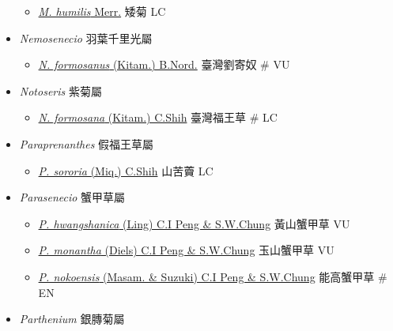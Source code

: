 \begin{itemize}
  \begin{itemize}
        \item[] \href{http://www.theplantlist.org/tpl1.1/search?q=Myriactis+humilis}{\textit{M. humilis} Merr.}   矮菊   LC
  \end{itemize}
 \item[] \textit{Nemosenecio} 羽葉千里光屬
                                
  \begin{itemize}
        \item[] \href{http://www.theplantlist.org/tpl1.1/search?q=Nemosenecio+formosanus}{\textit{N. formosanus} (Kitam.) B.Nord.}   臺灣劉寄奴  \# VU
  \end{itemize}
 \item[] \textit{Notoseris} 紫菊屬
                                
  \begin{itemize}
        \item[] \href{http://www.theplantlist.org/tpl1.1/search?q=Notoseris+formosana}{\textit{N. formosana} (Kitam.) C.Shih}   臺灣福王草  \# LC
  \end{itemize}
 \item[] \textit{Paraprenanthes} 假福王草屬
                                
  \begin{itemize}
        \item[] \href{http://www.theplantlist.org/tpl1.1/search?q=Paraprenanthes+sororia}{\textit{P. sororia} (Miq.) C.Shih}   山苦藚   LC
  \end{itemize}
 \item[] \textit{Parasenecio} 蟹甲草屬
                                
  \begin{itemize}
        \item[] \href{http://www.theplantlist.org/tpl1.1/search?q=Parasenecio+hwangshanica}{\textit{P. hwangshanica} (Ling) C.I Peng \& S.W.Chung}   黃山蟹甲草   VU
        \item[] \href{http://www.theplantlist.org/tpl1.1/search?q=Parasenecio+monantha}{\textit{P. monantha} (Diels) C.I Peng \& S.W.Chung}   玉山蟹甲草   VU
        \item[] \href{http://www.theplantlist.org/tpl1.1/search?q=Parasenecio+nokoensis}{\textit{P. nokoensis} (Masam. \& Suzuki) C.I Peng \& S.W.Chung}   能高蟹甲草  \# EN
  \end{itemize}
 \item[] \textit{Parthenium} 銀膞菊屬
                                

\end{itemize}
